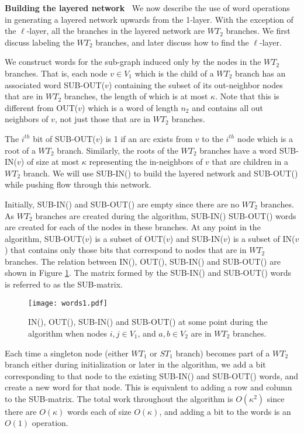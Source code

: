 \documentclass{article}
\begin{document}
{\bf Building the layered network~} We now describe the use of word operations in generating a layered network upwards from the 1-layer. With the exception of the $\ell$-layer, all the branches in the layered network are $WT_2$ branches. We first discuss labeling the $WT_2$ branches, and later discuss how to find the $\ell$-layer.

We construct words for the sub-graph induced only by the nodes in the $WT_2$ branches. That is, each node $v \in V_1$ which is the child of a $WT_2$ branch has an associated word SUB-OUT($v$) containing the subset of its out-neighbor nodes that are in $WT_2$ branches, the length of which is at most $\kappa$. Note that this is different from OUT($v$) which is a word of length $n_2$ and contains all out neighbors of $v$, not just those that are in $WT_2$ branches.

The $i^{th}$ bit of SUB-OUT($v$) is 1 if an arc exists from $v$ to the $i^{th}$ node which is a root of a $WT_2$ branch. Similarly, the roots of the $WT_2$ branches have a word SUB-IN($v$) of size at most $\kappa$ representing the in-neighbors of $v$ that are children in a $WT_2$ branch.  We will use SUB-IN() to build the layered network and SUB-OUT() while pushing flow through this network.

Initially, SUB-IN() and SUB-OUT() are empty since there are no $WT_2$ branches.  As $WT_2$ branches are created during the algorithm, SUB-IN() SUB-OUT() words are created for each of the nodes in these branches. At any point in the algorithm, SUB-OUT($v$) is a subset of OUT($v$) and SUB-IN($v$) is a subset of IN($v$) that contains only those bits that correspond to nodes that are in $WT_2$ branches. The relation between IN(), OUT(), SUB-IN() and SUB-OUT() are shown in Figure \ref{fig:words1}. The matrix formed by the SUB-IN() and SUB-OUT() words is referred to as the SUB-matrix.

\begin{figure}[ht]
\centerline{\texttt{[image: words1.pdf]}}
\caption{\label{fig:words1}IN(), OUT(), SUB-IN() and SUB-OUT() at some point during the algorithm when nodes $i, j \in V_1$, and $a, b \in V_2$ are in $WT_2$ branches.}
\end{figure}

Each time a singleton node (either $WT_1$ or $ST_1$ branch) becomes part of a $WT_2$ branch either during initialization or later in the algorithm, we add a bit corresponding to that node to the existing SUB-IN() and SUB-OUT() words, and create a new word for that node. This is equivalent to adding a row and column to the SUB-matrix. The total work  throughout the algorithm is $O(\kappa^2)$ since there are $O(\kappa)$ words each of size $O(\kappa)$, and adding a bit to the words is an $O(1)$ operation.
\end{document}
